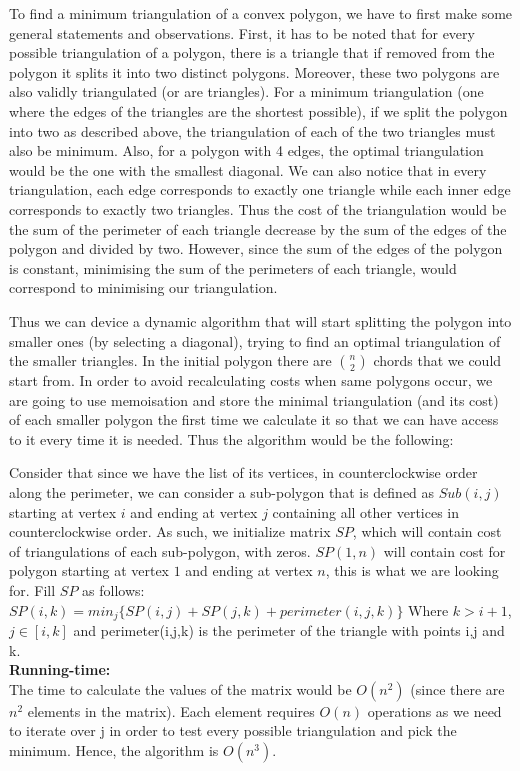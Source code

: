 To find a minimum triangulation of a convex polygon, we have to first make some general statements and observations. First, it has to be noted that for every possible triangulation of a polygon, there is a triangle that if removed from the polygon it splits it into two distinct polygons. Moreover, these two polygons are also validly triangulated (or are triangles). For a minimum triangulation (one where the edges of the triangles are the shortest possible), if we split the polygon into two as described above, the triangulation of each of the two triangles must also be minimum. Also, for a polygon with 4 edges, the optimal triangulation would be the one with the smallest diagonal. We can also notice that in every triangulation, each edge corresponds to exactly one triangle while each inner edge corresponds to exactly two triangles. Thus the cost of the triangulation would be the sum of the perimeter of each triangle decrease by the sum of the edges of the polygon and divided by two. However, since the sum of the edges of the polygon is constant, minimising the sum of the perimeters of each triangle, would correspond to minimising our triangulation. 

Thus we can device a dynamic algorithm that will start splitting the polygon into smaller ones (by selecting a diagonal), trying to find an optimal triangulation of the smaller triangles. In the initial polygon there are $\binom n 2$ chords that we could start from. In order to avoid recalculating costs when same polygons occur, we are going to use memoisation and store the minimal triangulation (and its cost) of each smaller polygon the first time we calculate it so that we can have access to it every time it is needed. Thus the algorithm would be the following:

Consider that since we have the list of its vertices, in counterclockwise order along the perimeter, we can consider a sub-polygon that is defined as $Sub(i,j)$ starting at vertex $i$ and ending at vertex $j$ containing all other vertices in counterclockwise order. As such, we initialize matrix $SP$, which will contain cost of triangulations of each sub-polygon, with zeros. $SP(1,n)$ will contain cost for polygon starting at vertex $1$ and ending at vertex $n$, this is what we are looking for. Fill $SP$ as follows: $SP(i,k) = min_j \{SP(i,j) + SP(j,k) + perimeter(i,j,k)\}$ Where $k > i+1$, $j \in [i,k]$ and perimeter(i,j,k) is the perimeter of the triangle with points i,j and k.\\

\textbf{Running-time:}\\
The time to calculate the values of the matrix would be $O(n^2)$ (since there are $n^2$ elements in the matrix). Each element requires $O(n)$ operations as we need to iterate over j in order to test every possible triangulation and pick the minimum. Hence, the algorithm is $O(n^3)$.